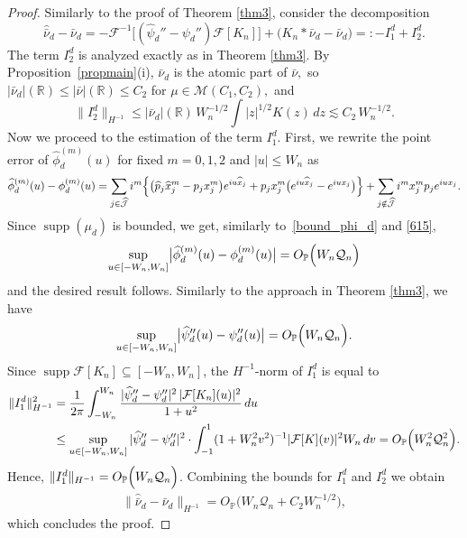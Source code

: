 \documentclass[numbers,webpdf,imaiai]{ima-authoring-template}%
\theoremstyle{thmstyletwo}%
\newcommand{\R}{\mathbb{R}}
\newcommand{\F}{\mathcal{F}}
\renewcommand{\P}{\mathbb{P}}
\newcommand{\mJ}{\mathcal{J}}
\newcommand{\mQ}{\mathcal{Q}}
\newcommand{\supp}{\operatorname{supp}}
\numberwithin{equation}{section}
\begin{document}
\begin{proof}
Similarly to the proof of Theorem \ref{thm3}, consider the decomposition 
\[
\widehat{\bar\nu}_d-\bar\nu_d
=-\F^{-1}\bigl[(\widehat\psi_d''-\psi_d'')\F[K_n]\bigr]
+\bigl(K_n*\bar\nu_d-\bar\nu_d\bigr)=:-I_1^d+I_2^d.
\]
The term $I_2^d$ is analyzed exactly as in Theorem \ref{thm3}. By Proposition~\ref{propmain}(i), $\bar\nu_d$ is the atomic part of $\bar\nu,$ so $|\bar\nu_d|(\R)\leq|\bar\nu|(\R)\leq C_2$ for $\mu\in\mathcal{M}(C_1,C_2),$ and
\[
\|I_2^d\|_{H^{-1}}\le|\bar\nu_d|(\R)\,W_n^{-1/2}\!\int|z|^{1/2}K(z)\,dz\lesssim C_2\, W_n^{-1/2}.
\]
Now we proceed to the estimation of the term $I_1^d$. 
First, we rewrite the point error of \(\widehat\phi_d^{(m)}(u)\) for fixed $m=0,1,2$ and $|u| \leq W_n$ as 
\[
\widehat\phi_d^{(m)}(u)-\phi_d^{(m)}(u)=\sum_{j\in\widehat{\mJ}}i^m\Bigl\{
\bigl(\widehat{p}_j\widehat{x}_j^m-p_jx_j^m\bigr)e^{iu\widehat{x}_j}
+p_jx_j^m\bigl(e^{iu\widehat{x}_j}-e^{iux_j}\bigr)\Bigr\} + \sum_{j \notin \widehat{\mJ}} i^m x_j^{m} p_je^{iux_j}.
\]
Since $\supp(\mu_d)$ is bounded, we get, similarly to~\eqref{bound_phi_d} and \eqref{615},
\begin{equation*}
    \sup_{u\in [-W_n, W_n]}\bigl|\widehat\phi_d^{(m)}(u)-\phi_d^{(m)}(u)\bigr|
=O_\P\Bigl(W_n \mQ_n\Bigr)
\end{equation*}
and the desired result follows. Similarly to the approach in Theorem \ref{thm3}, we have
\[
\sup_{u\in [-W_n, W_n]}\bigl|\widehat\psi_d''(u)-\psi_d''(u)\bigr|
=O_\P\Bigl(W_n\mQ_n\Bigr).
\]
Since $\supp\F[K_n]\subseteq[-W_n,W_n]$, the $H^{-1}$-norm of $I_1^d$ is equal to 
\begin{align*}
\|I_1^d\|^2_{H^{-1}}
&=\frac1{2\pi}\int_{-W_n}^{W_n}\frac{|\widehat\psi_d''-\psi_d''|^2\,|\F[K_n](u)|^2}{1+u^2}\,du \\
&\leq\sup_{u\in [-W_n, W_n]}|\widehat\psi_d''-\psi_d''|^2\cdot\int_{-1}^{1}(1+W_n^2v^2)^{-1}|\F[K](v)|^2W_n\,dv =O_\P\Bigl( W_n^{2} \mQ_n^2\Bigr).
\end{align*}
Hence, $\|I_1^d\|_{H^{-1}}=O_\P\Bigl(W_n\mQ_n\Bigr)$. Combining the bounds for $I_1^d$ and $I_2^d$ we obtain \begin{align*}\|\widehat{\bar\nu}_d-\bar\nu_d\|_{H^{-1}}=O_\P\bigl(W_n\mQ_n+C_2 W_n^{-1/2}\bigr),\end{align*} which concludes the proof.\end{proof}
\end{document}
